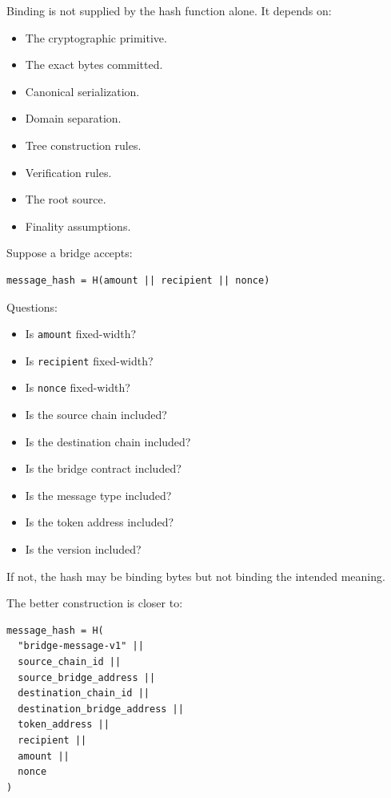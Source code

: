Binding is not supplied by the hash function alone. It depends on:

\begin{itemize}
\tightlist
\item
  The cryptographic primitive.
\item
  The exact bytes committed.
\item
  Canonical serialization.
\item
  Domain separation.
\item
  Tree construction rules.
\item
  Verification rules.
\item
  The root source.
\item
  Finality assumptions.
\end{itemize}

Suppose a bridge accepts:

\begin{lstlisting}
message_hash = H(amount || recipient || nonce)
\end{lstlisting}

Questions:

\begin{itemize}
\tightlist
\item
  Is \passthrough{\lstinline!amount!} fixed-width?
\item
  Is \passthrough{\lstinline!recipient!} fixed-width?
\item
  Is \passthrough{\lstinline!nonce!} fixed-width?
\item
  Is the source chain included?
\item
  Is the destination chain included?
\item
  Is the bridge contract included?
\item
  Is the message type included?
\item
  Is the token address included?
\item
  Is the version included?
\end{itemize}

If not, the hash may be binding bytes but not binding the intended
meaning.

The better construction is closer to:

\begin{lstlisting}
message_hash = H(
  "bridge-message-v1" ||
  source_chain_id ||
  source_bridge_address ||
  destination_chain_id ||
  destination_bridge_address ||
  token_address ||
  recipient ||
  amount ||
  nonce
)
\end{lstlisting}

